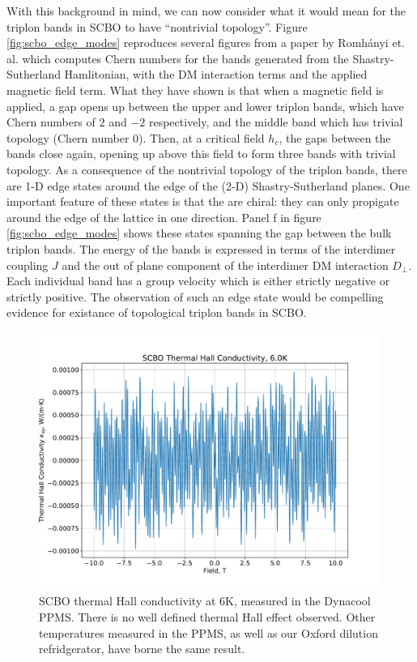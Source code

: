 \documentclass{thesis-umich}
\begin{document}
With this background in mind, we can now consider what it would mean for the triplon bands in SCBO to have ``nontrivial topology''. Figure \ref{fig:scbo_edge_modes} reproduces several figures from a paper by Romh\'{a}nyi et. al. which computes Chern numbers for the bands generated from the Shastry-Sutherland Hamlitonian, with the DM interaction terms and the applied magnetic field term. What they have shown is that when a magnetic field is applied, a gap opens up between the upper and lower triplon bands, which have Chern numbers of $2$ and $-2$ respectively, and the middle band which has trivial topology (Chern number 0). Then, at a critical field $h_c$, the gaps between the bands close again, opening up above this field to form three bands with trivial topology. As a consequence of the nontrivial topology of the triplon bands, there are 1-D edge states around the edge of the (2-D) Shastry-Sutherland planes. One important feature of these states is that the are chiral: they can only propigate around the edge of the lattice in one direction. Panel f in figure \ref{fig:scbo_edge_modes} shows these states spanning the gap between the bulk triplon bands. The energy of the bands is expressed in terms of the interdimer coupling $J$ and the out of plane component of the interdimer DM interaction $D_\perp$. Each individual band has a group velocity which is either strictly negative or strictly positive. The observation of such an edge state would be compelling evidence for existance of topological triplon bands in SCBO.

\begin{figure}
	\centering
	\caption[SCBO Thermal Hall: Negative Result]{SCBO thermal Hall conductivity at 6K, measured in the Dynacool PPMS. There is no well defined thermal Hall effect observed. Other temperatures measured in the PPMS, as well as our Oxford dilution refridgerator, have borne the same result.}
	\label{fig:scbo_thall_neg}
	\includegraphics[width=\columnwidth]{figures/SCBO_Thermal_Hall_Negative.pdf}
\end{figure}
\end{document}
